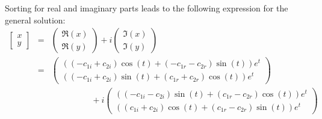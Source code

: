           Sorting for real and imaginary parts leads to the following expression for the general solution:\begin{eqnarray}
\left[\begin{smallmatrix}x\\y\end{smallmatrix}\right]&=&\left(\begin{array}{c}\Re(x) \\ \Re(y) \end{array}\right)+i \left(\begin{array}{c}\Im(x) \\ \Im(y) \end{array}\right)\nonumber \\ &=&\left(\begin{array}{c}\left(\left(- c_{1i} + c_{2i}\right) \cos{\left (t \right )} + \left(- c_{1r} - c_{2r}\right) \sin{\left (t \right )}\right) e^{t} \\ \left(\left(- c_{1i} + c_{2i}\right) \sin{\left (t \right )} + \left(c_{1r} + c_{2r}\right) \cos{\left (t \right )}\right) e^{t}\end{array}\right)\nonumber \\&& \hspace{2cm} + i \left(\begin{array}{c}\left(\left(- c_{1i} - c_{2i}\right) \sin{\left (t \right )} + \left(c_{1r} - c_{2r}\right) \cos{\left (t \right )}\right) e^{t} \\ \left(\left(c_{1i} + c_{2i}\right) \cos{\left (t \right )} + \left(c_{1r} - c_{2r}\right) \sin{\left (t \right )}\right) e^{t} \end{array}\right)\label{realim}\end{eqnarray}
